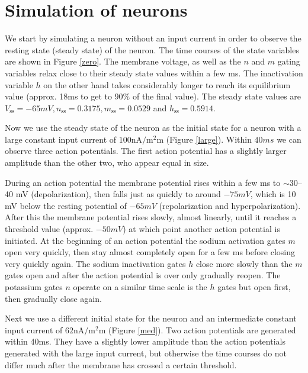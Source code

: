 \documentclass{scrartcl}
\begin{document}
\section{Simulation of neurons}
We start by simulating a neuron without an input current in order to observe the resting state (steady state) of the neuron. The time courses of the state variables are shown in Figure \ref{zero}. The membrane voltage, as well as the $n$ and $m$ gating variables relax close to their steady state values within a few \si{ms}. The inactivation variable $h$ on the other hand takes considerably longer to reach its equilibrium value (approx. 18\si{ms} to get to $90\%$ of the final value). The steady state values are $V_\textrm{ss} = -65 \si{mV}, n_\textrm{ss} = 0.3175, m_\textrm{ss}=0.0529$ and $h_\textrm{ss} = 0.5914$.

Now we use the steady state of the neuron as the initial state for a neuron with a large constant input current of $100 \si{\nano\ampere\per\square\milli\meter}$ (Figure \ref{large}). Within $40 \si{ms}$ we can observe three action potentials. The first action potential has a slightly larger amplitude than the other two, who appear equal in size.

During an action potential the membrane potential rises within a few \si{ms} to $\sim$30--40 \si{mV} (depolarization), then falls just as quickly to around $-75 \si{mV}$, which is 10 \si{mV} below the resting potential of $-65\si{mV}$ (repolarization and hyperpolarization). After this the membrane potential rises slowly, almost linearly, until it reaches a threshold value (approx. $-50 \si{mV}$) at which point another action potential is initiated. At the beginning of an action potential the sodium activation gates $m$ open very quickly, then stay almost completely open for a few \si{ms} before closing very quickly again. The sodium inactivation gates $h$ close more slowly than the $m$ gates open and after the action potential is over only gradually reopen. The potassium gates $n$ operate on a similar time scale is the $h$ gates but open first, then gradually close again.

Next we use a different initial state for the neuron and an intermediate constant input current of $62 \si{\nano\ampere\per\square\milli\meter}$ (Figure \ref{med}). Two action potentials are generated within 40\si{ms}. They have a slightly lower amplitude than the action potentials generated with the large input current, but otherwise the time courses do not differ much after the membrane has crossed a certain threshold.
\end{document}
